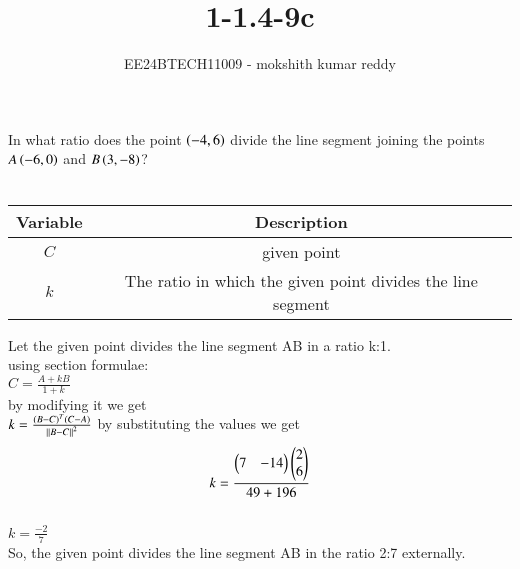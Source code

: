 \documentclass[journal]{IEEEtran}
\begin{document}

\vspace{3cm}

\title{1-1.4-9c}
\author{EE24BTECH11009 - mokshith kumar reddy}
{\let\newpage\relax\maketitle}

\renewcommand{\thefigure}{\theenumi}
\renewcommand{\thetable}{\theenumi}
\setlength{\intextsep}{10pt} %


\renewcommand{\thetable}{\theenumi}

In what ratio does the point $\left(-4,6\right)$ divide the line segment joining the points $A\left(-6,0\right)$ and $B\left(3,-8\right)$?\\
\solution \\
\begin{tabular}[12pt]{ |c| c|}
    \hline
    \textbf{Variable} & \textbf{Description}\\ 
    \hline
    $C$ & given point \\
    \hline 
    $k$ & The ratio in which the given point divides the line segment\\
    \hline   
    \end{tabular}
Let the given point divides the line segment AB in a ratio k:1.\\
using section formulae:\\
$C=\frac{A+kB}{1+k}$\\
by modifying it we get\\
$k=\frac{(B-C)^T(C-A)}{\left\vert\left\vert B-C\right\vert\right\vert^2}$
by substituting the values we get\\
\begin{align}
k=\frac{
\begin{pmatrix}
7 & -14
\end{pmatrix}
\begin{pmatrix}
2\\
6
\end{pmatrix}
}{49+196}
\end{align}\\
$k=\frac{-2}{7}$\\
So, the given point divides the line segment AB in the ratio 2:7 externally.
\end{document}
